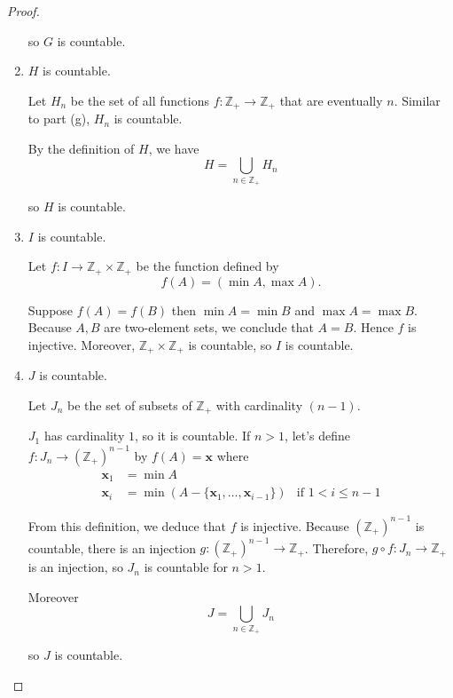 \begin{proof}
\begin{enumerate}[label={(\alph*)}]
              so $G$ is countable.
        \item $H$ is countable.

              Let $H_{n}$ be the set of all functions $f: \mathbb{Z}_{+}\to\mathbb{Z}_{+}$ that are eventually $n$. Similar to part (g), $H_{n}$ is countable.

              By the definition of $H$, we have
              \[
                  H = \bigcup_{n\in\mathbb{Z}_{+}} H_{n}
              \]

              so $H$ is countable.
        \item $I$ is countable.

              Let $f: I\to \mathbb{Z}_{+}\times\mathbb{Z}_{+}$ be the function defined by
              \[
                  f(A) = (\min A, \max A).
              \]

              Suppose $f(A) = f(B)$ then $\min A = \min B$ and $\max A = \max B$. Because $A, B$ are two-element sets, we conclude that $A = B$. Hence $f$ is injective. Moreover, $\mathbb{Z}_{+}\times\mathbb{Z}_{+}$ is countable, so $I$ is countable.
        \item $J$ is countable.

              Let $J_{n}$ be the set of subsets of $\mathbb{Z}_{+}$ with cardinality $(n - 1)$.

              $J_{1}$ has cardinality $1$, so it is countable. If $n > 1$, let's define $f: J_{n}\to {(\mathbb{Z}_{+})}^{n-1}$ by $f(A) = \mathbf{x}$ where
              \begin{align*}
                  \mathbf{x}_{1} & = \min A                                                                                \\
                  \mathbf{x}_{i} & = \min (A - \{ \mathbf{x}_{1}, \ldots, \mathbf{x}_{i-1} \}) & \text{if $1 < i\leq n-1$}
              \end{align*}

              From this definition, we deduce that $f$ is injective. Because ${(\mathbb{Z}_{+})}^{n-1}$ is countable, there is an injection $g: {(\mathbb{Z}_{+})}^{n-1}\to \mathbb{Z}_{+}$. Therefore, $g\circ f: J_{n}\to \mathbb{Z}_{+}$ is an injection, so $J_{n}$ is countable for $n > 1$.

              Moreover
              \[
                  J = \bigcup_{n\in\mathbb{Z}_{+}}J_{n}
              \]

              so $J$ is countable.
    \end{enumerate}
\end{proof}


